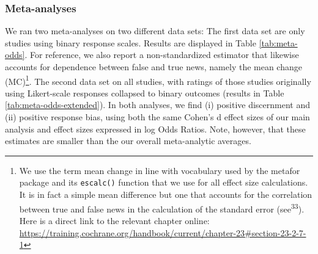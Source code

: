 \documentclass[
  man]{apa6}
\begin{document}
\subsubsection{Meta-analyses}\label{meta-analyses}

We ran two meta-analyses on two different data sets: The first data set are only studies using binary response scales. Results are displayed in Table \ref{tab:meta-odds}. For reference, we also report a non-standardized estimator that likewise accounts for dependence between false and true news, namely the mean change (MC)\footnote{We use the term mean change in line with vocabulary used by the metafor package and its \texttt{escalc()} function that we use for all effect size calculations. It is in fact a simple mean difference but one that accounts for the correlation between true and false news in the calculation of the standard error (see\textsuperscript{33}). Here is a direct link to the relevant chapter online: \url{https://training.cochrane.org/handbook/current/chapter-23\#section-23-2-7-1}}. The second data set on all studies, with ratings of those studies originally using Likert-scale responses collapsed to binary outcomes (results in Table \ref{tab:meta-odds-extended}). In both analyses, we find (i) positive discernment and (ii) positive response bias, using both the same Cohen's d effect sizes of our main analysis and effect sizes expressed in log Odds Ratios. Note, however, that these estimates are smaller than the our overall meta-analytic averages.
\end{document}
